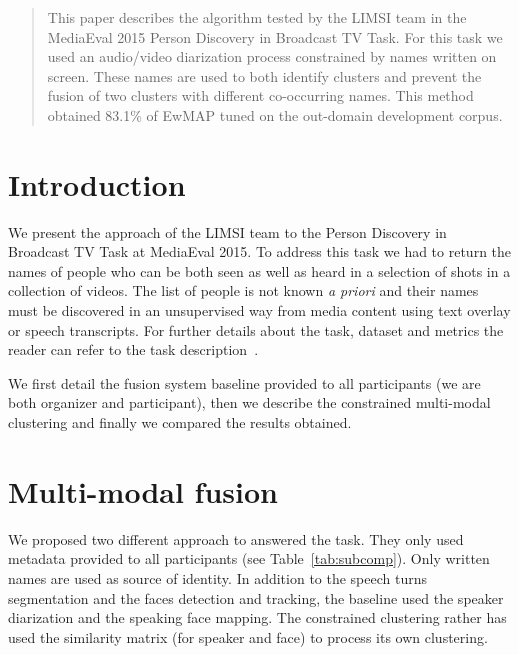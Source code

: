 \documentclass{acm_proc_article-me}
\begin{document}
\maketitle
\begin{abstract}

This paper describes the algorithm tested by the LIMSI team in the MediaEval 2015 Person Discovery in Broadcast TV Task. For this task we used an audio/video diarization process constrained by names written on screen. These names are used to both identify clusters and prevent the fusion of two clusters with different co-occurring names. This method obtained 83.1\% of EwMAP tuned on the out-domain development corpus.

\end{abstract}


\section{Introduction}

We present the approach of the LIMSI team to the Person Discovery in Broadcast TV Task at MediaEval 2015. To address this task we had to return the names of people who can be both seen as well as heard in a selection of shots in a collection of videos. The list of people is not known \emph{a priori} and their names must be discovered in an unsupervised way from media content using text overlay or speech transcripts. For further details about the task, dataset and metrics the reader can refer to the task description~\cite{POIGNANT--MEDIAEVAL--2015}. 

We first detail the fusion system baseline provided to all participants (we are both organizer and participant), then we describe the constrained multi-modal clustering and finally we compared the results obtained.

\section{Multi-modal fusion}

We proposed two different approach to answered the task. They only used metadata provided to all participants (see Table~\ref{tab:subcomp}). Only written names are used as source of identity. In addition to the speech turns segmentation and the faces detection and tracking, the baseline used the speaker diarization and the speaking face mapping. The constrained clustering rather has used the similarity matrix (for speaker and face) to process its own clustering.
\end{document}
